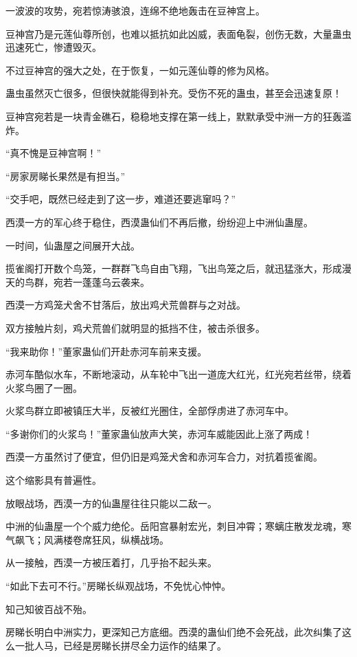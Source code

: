 \begin{this_body}
一波波的攻势，宛若惊涛骇浪，连绵不绝地轰击在豆神宫上。

豆神宫乃是元莲仙尊所创，也难以抵抗如此凶威，表面龟裂，创伤无数，大量蛊虫迅速死亡，惨遭毁灭。

不过豆神宫的强大之处，在于恢复，一如元莲仙尊的修为风格。

蛊虫虽然灭亡很多，但很快就能得到补充。受伤不死的蛊虫，甚至会迅速复原！

豆神宫宛若是一块青金礁石，稳稳地支撑在第一线上，默默承受中洲一方的狂轰滥炸。

“真不愧是豆神宫啊！”

“房家房睇长果然是有担当。”

“交手吧，既然已经走到了这一步，难道还要逃窜吗？”

西漠一方的军心终于稳住，西漠蛊仙们不再后撤，纷纷迎上中洲仙蛊屋。

一时间，仙蛊屋之间展开大战。

揽雀阁打开数个鸟笼，一群群飞鸟自由飞翔，飞出鸟笼之后，就迅猛涨大，形成漫天的鸟群，宛若一蓬蓬乌云袭来。

西漠一方鸡笼犬舍不甘落后，放出鸡犬荒兽群与之对战。

双方接触片刻，鸡犬荒兽们就明显的抵挡不住，被击杀很多。

“我来助你！”董家蛊仙们开赴赤河车前来支援。

赤河车酷似水车，不断地滚动，从车轮中飞出一道庞大红光，红光宛若丝带，绕着火浆鸟圈了一圈。

火浆鸟群立即被镇压大半，反被红光圈住，全部俘虏进了赤河车中。

“多谢你们的火浆鸟！”董家蛊仙放声大笑，赤河车威能因此上涨了两成！

西漠一方虽然讨了便宜，但仍旧是鸡笼犬舍和赤河车合力，对抗着揽雀阁。

这个缩影具有普遍性。

放眼战场，西漠一方的仙蛊屋往往只能以二敌一。

中洲的仙蛊屋一个个威力绝伦。岳阳宫暴射宏光，刺目冲霄；寒螭庄散发龙魂，寒气飙飞；风满楼卷席狂风，纵横战场。

从一接触，西漠一方被压着打，几乎抬不起头来。

“如此下去可不行。”房睇长纵观战场，不免忧心忡忡。

知己知彼百战不殆。

房睇长明白中洲实力，更深知己方底细。西漠的蛊仙们绝不会死战，此次纠集了这么一批人马，已经是房睇长拼尽全力运作的结果了。


\end{this_body}
